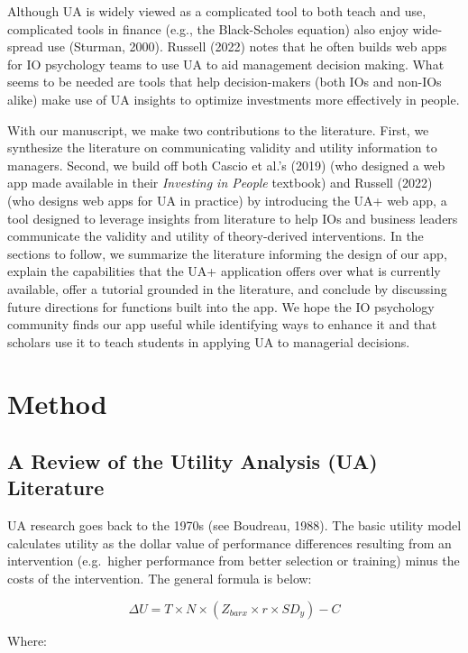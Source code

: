 \documentclass[
]{article}
\begin{document}
Although UA is widely viewed as a complicated tool to both teach and
use, complicated tools in finance (e.g., the Black-Scholes equation)
also enjoy wide-spread use (Sturman, 2000). Russell (2022) notes that he
often builds web apps for IO psychology teams to use UA to aid
management decision making. What seems to be needed are tools that help
decision-makers (both IOs and non-IOs alike) make use of UA insights to
optimize investments more effectively in people.

With our manuscript, we make two contributions to the literature. First,
we synthesize the literature on communicating validity and utility
information to managers. Second, we build off both Cascio et al.'s
(2019) (who designed a web app made available in their \emph{Investing
in People} textbook) and Russell (2022) (who designs web apps for UA in
practice) by introducing the UA+ web app, a tool designed to leverage
insights from literature to help IOs and business leaders communicate
the validity and utility of theory-derived interventions. In the
sections to follow, we summarize the literature informing the design of
our app, explain the capabilities that the UA+ application offers over
what is currently available, offer a tutorial grounded in the
literature, and conclude by discussing future directions for functions
built into the app. We hope the IO psychology community finds our app
useful while identifying ways to enhance it and that scholars use it to
teach students in applying UA to managerial decisions.

\section{Method}\label{method}

\subsection{A Review of the Utility Analysis (UA)
Literature}\label{a-review-of-the-utility-analysis-ua-literature}

UA research goes back to the 1970s (see Boudreau, 1988). The basic
utility model calculates utility as the dollar value of performance
differences resulting from an intervention (e.g.~higher performance from
better selection or training) minus the costs of the intervention. The
general formula is below:

\[\Delta U = T \times N \times (Z_{barx} \times r \times SD_y) - C\]

Where:
\end{document}
